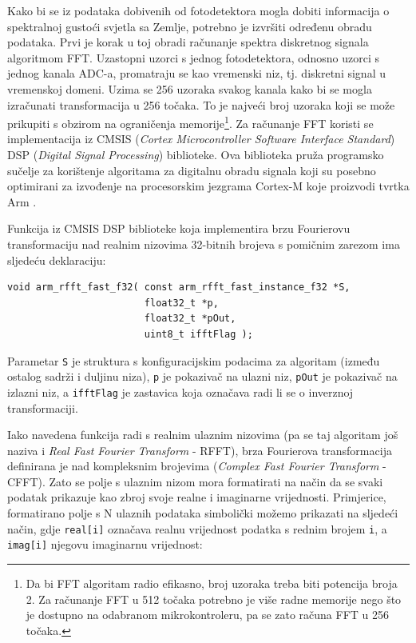Kako bi se iz podataka dobivenih od fotodetektora mogla dobiti informacija o spektralnoj gustoći svjetla sa Zemlje, potrebno je izvršiti određenu obradu podataka. Prvi je korak u toj obradi računanje spektra diskretnog signala algoritmom FFT. Uzastopni uzorci s jednog fotodetektora, odnosno uzorci s jednog kanala ADC-a, promatraju se kao vremenski niz, tj. diskretni signal u vremenskoj domeni. Uzima se 256 uzoraka svakog kanala kako bi se mogla izračunati transformacija u 256 točaka. To je najveći broj uzoraka koji se može prikupiti s obzirom na ograničenja memorije\footnote{Da bi FFT algoritam radio efikasno, broj uzoraka treba biti potencija broja 2. Za računanje FFT u 512 točaka potrebno je više radne memorije nego što je dostupno na odabranom mikrokontroleru, pa se zato računa FFT u 256 točaka.}. Za računanje FFT koristi se implementacija iz CMSIS (\textit{Cortex Microcontroller Software Interface Standard}) DSP (\textit{Digital Signal Processing}) biblioteke. Ova biblioteka pruža programsko sučelje za korištenje algoritama za digitalnu obradu signala koji su posebno optimirani za izvođenje na procesorskim jezgrama Cortex-M koje proizvodi tvrtka Arm \cite{cmsis_dsp_documentation}.

Funkcija iz CMSIS DSP biblioteke koja implementira brzu Fourierovu transformaciju nad realnim nizovima 32-bitnih brojeva s pomičnim zarezom ima sljedeću deklaraciju:

\begin{lstlisting}[caption={Deklaracija funkcije \texttt{arm\_rfft\_fast\_f32}}]
void arm_rfft_fast_f32( const arm_rfft_fast_instance_f32 *S,
                        float32_t *p,
                        float32_t *pOut,
                        uint8_t ifftFlag );	
\end{lstlisting}

Parametar \texttt{S} je struktura s konfiguracijskim podacima za algoritam (između ostalog sadrži i duljinu niza), \texttt{p} je pokazivač na ulazni niz, \texttt{pOut} je pokazivač na izlazni niz, a \texttt{ifftFlag} je zastavica koja označava radi li se o inverznoj transformaciji.

Iako navedena funkcija radi s realnim ulaznim nizovima (pa se taj algoritam još naziva i \textit{Real Fast Fourier Transform} - RFFT), brza Fourierova transformacija definirana je nad kompleksnim brojevima (\textit{Complex Fast Fourier Transform} - CFFT). Zato se polje s ulaznim nizom mora formatirati na način da se svaki podatak prikazuje kao zbroj svoje realne i imaginarne vrijednosti. Primjerice, formatirano polje s N ulaznih podataka simbolički možemo prikazati na sljedeći način, gdje \texttt{real[i]} označava realnu vrijednost podatka s rednim brojem \texttt{i}, a \texttt{imag[i]} njegovu imaginarnu vrijednost:

